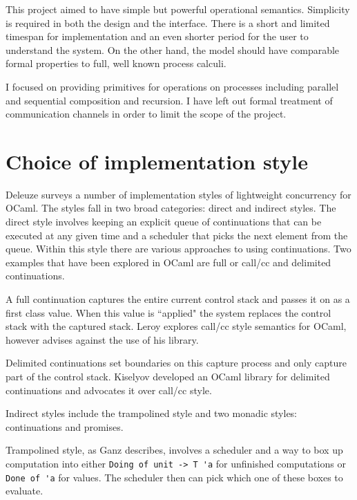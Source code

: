 \documentclass[12pt,twoside,notitlepage]{report}
\theoremstyle{plain}%
\theoremstyle{definition}
\theoremstyle{remark}
\begin{document}

This project aimed to have simple but powerful operational semantics. Simplicity is required in both the design and the interface. There is a short and limited timespan for implementation and an even shorter period for the user to understand the system. On the other hand, the model should have comparable formal properties to full, well known process calculi. 

I focused on providing primitives for operations on processes including parallel and sequential composition and recursion. I have left out formal treatment of communication channels in order to limit the scope of the project.  


\section{Choice of implementation style}  
Deleuze\cite{deleuzelight} surveys a number of implementation styles of lightweight concurrency for OCaml. The styles fall in two broad categories: direct and indirect styles. The direct style involves keeping an explicit queue of continuations that can be executed at any given time and a scheduler that picks the next element from the queue.  Within this style there are various approaches to using continuations. Two examples that have been explored in OCaml are full or call/cc and delimited continuations. 

A full continuation captures the entire current control stack and passes it on as a first class value. When this value is ``applied" the system replaces the control stack with the captured stack. Leroy explores call/cc style semantics\cite{leroyocaml} for OCaml, however advises against the use of his library.

Delimited continuations set boundaries on this capture process and only capture part of the control stack. Kiselyov developed an OCaml library for delimited continuations\cite{kiselyov2010delimited, kiselyov2012delimited} and advocates it over call/cc style.

Indirect styles include the trampolined style and two monadic styles: continuations and promises. 

Trampolined style, as Ganz\cite{ganz1999trampolined} describes, involves a scheduler and a way to box up computation into either \lstinline|Doing of unit -> T 'a| for unfinished computations or \lstinline|Done of 'a| for values. The scheduler then can pick which one of these boxes to evaluate. 
\end{document}

